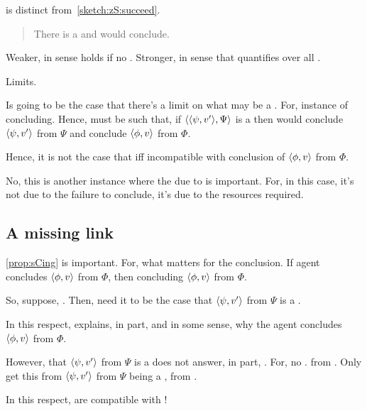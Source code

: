 \begin{note}
  \sCing{} is distinct from~\autoref{sketch:zS:succeed}.

  \begin{quote}
    There is a \curb{} and would conclude.
  \end{quote}

  Weaker, in sense holds if no \curb{}.
  Stronger, in sense that quantifies over all \curb{}.
\end{note}


\begin{note}
  Limits.

  Is going to be the case that there's a limit on what may be a \curb{}.
  For, instance of concluding.
  Hence, must be such that, if \(\langle \langle \psi, v' \rangle, \Psi \rangle\) is a \curb{} then would conclude \(\langle \psi, v' \rangle\) from \(\Psi\) and conclude \(\langle \phi, v \rangle\) from \(\Phi\).

  Hence, it is not the case that \curb{} iff incompatible with conclusion of \(\langle \phi, v \rangle\) from \(\Phi\).

  No, this is another instance where the due to is important.
  For, in this case, it's not due to the failure to conclude, it's due to the resources required.
\end{note}




\newpage

\subsection{A missing link}
\label{cha:zS:sec:missing-link}

\begin{note}
  \autoref{prop:sCing} is important.
  For, what matters for the conclusion.
  If agent concludes \(\langle \phi, v \rangle\) from \(\Phi\), then concluding \(\langle \phi, v \rangle\) from \(\Phi\).

  So, suppose, \curb{}.
  Then, need it to be the case that \(\langle \psi, v' \rangle\) from \(\Psi\) is a \fc{}.

  In this respect, \fc{} explains, in part, and in some sense, why the agent concludes \(\langle \phi, v \rangle\) from \(\Phi\).

  However, that \(\langle \psi, v' \rangle\) from \(\Psi\) is a \fc{} does not answer, in part, \qWhyVoP{}.
  For, no \ros{}.
  \ros{} from \agpe{}.
  Only get this from \(\langle \psi, v' \rangle\) from \(\Psi\) being a \fc{}, from \agpe{}.

  In this respect,  are compatible with \issueConstraint{}!
\end{note}

